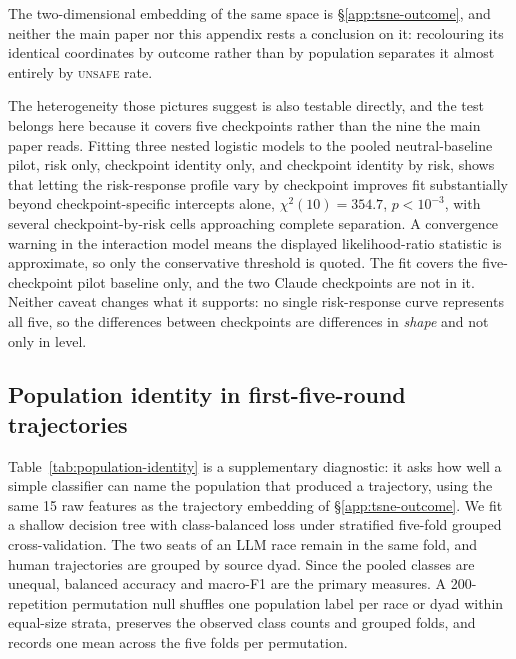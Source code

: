 \documentclass[sigconf,anonymous]{aamas}
\newcommand{\Unsafe}{\textsc{unsafe}}
\begin{document}
The two-dimensional embedding of the same space is
\S\ref{app:tsne-outcome}, and neither the main paper nor this
appendix rests a conclusion on it: recolouring its identical coordinates by
outcome rather than by population separates it almost entirely by \Unsafe{}
rate.

The heterogeneity those pictures suggest is also testable directly, and the
test belongs here because it covers five checkpoints rather than the nine the
main paper reads. Fitting three nested logistic models to the pooled
neutral-baseline pilot, risk only, checkpoint identity only, and checkpoint
identity by risk, shows that letting the risk-response profile vary by
checkpoint improves fit substantially beyond checkpoint-specific intercepts
alone, $\chi^2(10)=354.7$, $p<10^{-3}$, with several checkpoint-by-risk cells
approaching complete separation. A convergence warning in the interaction model
means the displayed likelihood-ratio statistic is approximate, so only the
conservative threshold is quoted. The fit covers the five-checkpoint pilot
baseline only, and the two Claude checkpoints are not in it. Neither caveat
changes what it supports: no single risk-response curve represents all five, so
the differences between checkpoints are differences in \emph{shape} and not
only in level.

\subsection{Population identity in first-five-round trajectories}
\label{app:population-identity}

Table~\ref{tab:population-identity} is a supplementary diagnostic: it asks how
well a simple classifier can name the population that
produced a trajectory, using the same 15 raw features as the trajectory
embedding of \S\ref{app:tsne-outcome}. We fit a shallow decision tree with
class-balanced loss under stratified five-fold grouped cross-validation. The
two seats of an LLM race remain in the same fold, and human trajectories are
grouped by source dyad. Since the pooled classes are unequal, balanced accuracy
and macro-F1 are the primary measures. A 200-repetition permutation null
shuffles one population label per race or dyad within equal-size strata,
preserves the observed class counts and grouped folds, and records one mean
across the five folds per permutation.
\end{document}
